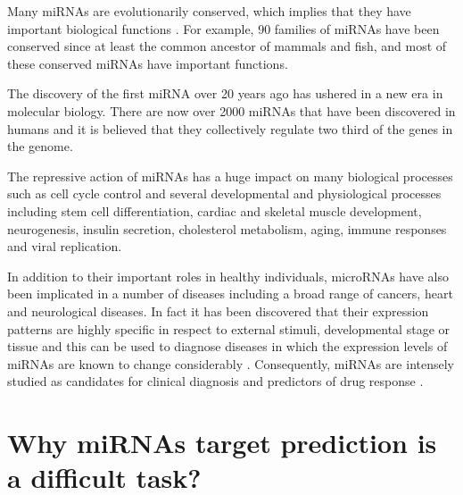 Many miRNAs are evolutionarily conserved, which implies that they have important biological functions \cite{conserved_pairing}. For example, 90 families of miRNAs have been conserved since at least the common ancestor of mammals and fish, and most of these conserved miRNAs have important functions.

The discovery of the first miRNA over 20 years ago has ushered in a new era in molecular biology. There are now over 2000 miRNAs that have been discovered in humans and it is believed that they collectively regulate two third of the genes in the genome.

The repressive action of miRNAs has a huge impact on many biological processes such as cell cycle control and several developmental and physiological processes including stem cell differentiation, cardiac and skeletal muscle development, neurogenesis, insulin secretion, cholesterol metabolism, aging, immune responses and viral replication. \cite{mirna_annotation}

In addition to their important roles in healthy individuals, microRNAs have also been implicated in a number of diseases including a broad range of cancers, heart and neurological diseases.  In fact it has been discovered that their expression patterns  are highly specific in respect to external stimuli, developmental stage or tissue and this can be used to diagnose diseases in which the expression levels of miRNAs are known to change considerably \cite{computational_methods}. Consequently, miRNAs are intensely studied as candidates for clinical diagnosis and predictors of drug response \cite{mirna_diseases}.

\section{Why miRNAs target prediction is a difficult task?}

